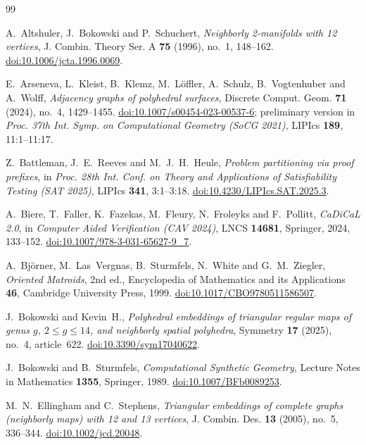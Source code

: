 \documentclass[11pt,reqno]{amsart}
\theoremstyle{plain}
\theoremstyle{definition}
\begin{document}
\begin{thebibliography}{99}

A.~Altshuler, J.~Bokowski and P.~Schuchert,
\emph{Neighborly 2-manifolds with 12 vertices},
J. Combin. Theory Ser. A \textbf{75} (1996), no.~1, 148--162.
\href{https://doi.org/10.1006/jcta.1996.0069}{doi:10.1006/jcta.1996.0069}.

E.~Arseneva, L.~Kleist, B.~Klemz, M.~Löffler, A.~Schulz, B.~Vogtenhuber and A.~Wolff,
\emph{Adjacency graphs of polyhedral surfaces},
Discrete Comput. Geom. \textbf{71} (2024), no.~4, 1429--1455.
\href{https://doi.org/10.1007/s00454-023-00537-6}{doi:10.1007/s00454-023-00537-6};
preliminary version in \emph{Proc. 37th Int. Symp. on Computational Geometry (SoCG 2021)},
LIPIcs \textbf{189}, 11:1--11:17.

Z.~Battleman, J.~E.~Reeves and M.~J.~H.~Heule,
\emph{Problem partitioning via proof prefixes},
in \emph{Proc. 28th Int. Conf. on Theory and Applications of Satisfiability Testing (SAT 2025)},
LIPIcs \textbf{341}, 3:1--3:18.
\href{https://doi.org/10.4230/LIPIcs.SAT.2025.3}{doi:10.4230/LIPIcs.SAT.2025.3}.

A.~Biere, T.~Faller, K.~Fazekas, M.~Fleury, N.~Froleyks and F.~Pollitt,
\emph{CaDiCaL 2.0},
in \emph{Computer Aided Verification (CAV 2024)}, LNCS \textbf{14681}, Springer, 2024, 133--152.
\href{https://doi.org/10.1007/978-3-031-65627-9_7}{doi:10.1007/978-3-031-65627-9\_7}.

A.~Björner, M.~Las~Vergnas, B.~Sturmfels, N.~White and G.~M.~Ziegler,
\emph{Oriented Matroids}, 2nd ed.,
Encyclopedia of Mathematics and its Applications \textbf{46}, Cambridge University Press, 1999.
\href{https://doi.org/10.1017/CBO9780511586507}{doi:10.1017/CBO9780511586507}.

J.~Bokowski and Kevin~H.,
\emph{Polyhedral embeddings of triangular regular maps of genus $g$, $2\le g\le14$,
and neighborly spatial polyhedra},
Symmetry \textbf{17} (2025), no.~4, article~622.
\href{https://doi.org/10.3390/sym17040622}{doi:10.3390/sym17040622}.

J.~Bokowski and B.~Sturmfels,
\emph{Computational Synthetic Geometry},
Lecture Notes in Mathematics \textbf{1355}, Springer, 1989.
\href{https://doi.org/10.1007/BFb0089253}{doi:10.1007/BFb0089253}.

M.~N.~Ellingham and C.~Stephens,
\emph{Triangular embeddings of complete graphs (neighborly maps) with 12 and 13 vertices},
J. Combin. Des. \textbf{13} (2005), no.~5, 336--344.
\href{https://doi.org/10.1002/jcd.20048}{doi:10.1002/jcd.20048}.


\end{thebibliography}
\end{document}
